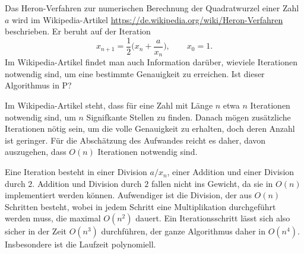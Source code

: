 Das Heron-Verfahren zur numerischen Berechnung der Quadratwurzel einer Zahl
$a$ wird im Wikipedia-Artikel
\url{https://de.wikipedia.org/wiki/Heron-Verfahren}
beschrieben.
Er beruht auf der Iteration
\[
x_{n+1}= \frac12\biggl(x_n+\frac{a}{x_n}\biggr),\qquad x_0=1.
\]
Im Wikipedia-Artikel findet man auch Information darüber, wieviele
Iterationen notwendig sind, um eine bestimmte Genauigkeit zu erreichen.
Ist dieser Algorithmus in P?


\begin{loesung}
Im Wikipedia-Artikel steht, dass für eine Zahl mit Länge $n$ etwa $n$
Iterationen notwendig sind, um $n$ Signifkante Stellen zu finden.
Danach mögen zusätzliche Iterationen nötig sein, um die volle Genauigkeit
zu erhalten, doch deren Anzahl ist geringer.
Für die Abschätzung des Aufwandes reicht es daher, davon auszugehen, dass
$O(n)$ Iterationen notwendig sind.

Eine Iteration besteht in einer Division $a/x_n$, einer Addition und
einer Division durch $2$. 
Addition und Division durch $2$
fallen nicht ins Gewicht, da sie in $O(n)$
implementiert werden können.
Aufwendiger ist die Division, der aus $O(n)$ Schritten besteht, wobei
in jedem Schritt eine Multiplikation durchgeführt werden muss, die
maximal $O(n^2)$ dauert.
Ein Iterationsschritt lässt sich also sicher in der Zeit $O(n^3)$ durchführen,
der ganze Algorithmus daher in $O(n^4)$.
Insbesondere ist die Laufzeit polynomiell.
\end{loesung}
